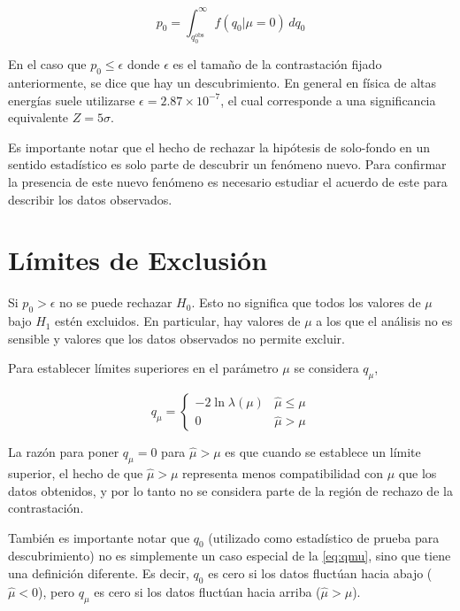 \begin{equation}
  p_0 = \int_{q_{0}^{\text{obs}}}^{\infty} f(q_0|\mu=0) \, dq_0
  \label{eq:p0}
\end{equation}

En el caso que $p_0 \leq \epsilon$ donde $\epsilon$ es el tamaño de la contrastación
fijado anteriormente, se dice que hay un descubrimiento. En general en física de
altas energías suele utilizarse $\epsilon = 2.87 \times 10^{-7}$, el cual
corresponde a una significancia equivalente $Z=5\sigma$.

Es importante notar que el hecho de rechazar la hipótesis de solo-fondo en un
sentido estadístico es solo parte de descubrir un fenómeno nuevo.
Para confirmar la presencia de este nuevo fenómeno es necesario estudiar
el acuerdo de este para describir los datos observados.


\section{Límites de Exclusión}
\label{sec:limits}

Si $p_0> \epsilon$ no se puede rechazar $H_0$. Esto no
significa que todos los valores de $\mu$ bajo $H_1$ estén excluidos.
En particular, hay valores de $\mu$ a los que el análisis no es sensible
y valores que los datos observados no permite excluir.

Para establecer límites superiores en el parámetro $\mu$ se considera
$q_\mu$,

\begin{equation}
  q_\mu =
  \begin{cases}
    -2 \ln \lambda(\mu) & \hat{\mu} \leq \mu \\
    0 & \hat{\mu} > \mu
  \end{cases} \label{eq:qmu}
\end{equation}

La razón para poner $q_\mu = 0$ para $\hat{\mu} > \mu$ es que cuando se
establece un límite superior, el hecho de que $\hat{\mu} > \mu$ representa menos
compatibilidad con $\mu$ que los datos obtenidos, y por lo tanto no se considera
parte de la región de rechazo de la contrastación.

También es importante notar que $q_0$ (utilizado como estadístico de prueba para
descubrimiento) no es simplemente un caso especial de la
\cref{eq:qmu}, sino que tiene una definición diferente. Es decir, $q_0$ es cero
si los datos fluctúan hacia abajo ($\hat{\mu}<0$), pero $q_\mu$ es cero si los
datos fluctúan hacia arriba ($\hat{\mu}>\mu$).

